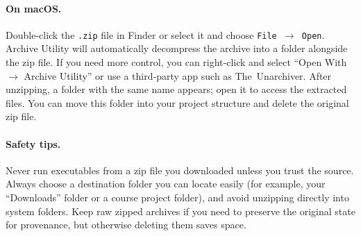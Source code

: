 \paragraph{On macOS.} Double‑click the \texttt{.zip} file in Finder or select it and choose \texttt{File \(\rightarrow\) Open}.  Archive Utility will automatically decompress the archive into a folder alongside the zip file.  If you need more control, you can right‑click and select ``Open With \(\rightarrow\) Archive Utility'' or use a third‑party app such as The~Unarchiver.  After unzipping, a folder with the same name appears; open it to access the extracted files.  You can move this folder into your project structure and delete the original zip file.

\paragraph{Safety tips.} Never run executables from a zip file you downloaded unless you trust the source.  Always choose a destination folder you can locate easily (for example, your ``Downloads'' folder or a course project folder), and avoid unzipping directly into system folders.  Keep raw zipped archives if you need to preserve the original state for provenance, but otherwise deleting them saves space.